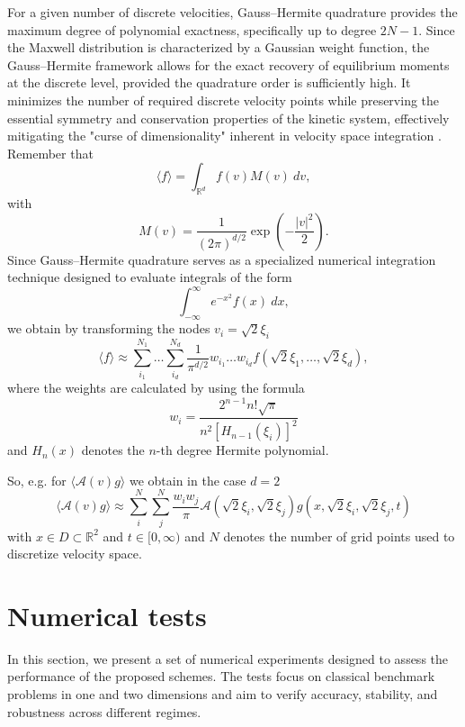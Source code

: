 \documentclass[final,11pt]{siamart251216}
\numberwithin{equation}{section}
\theoremstyle{definition}
\theoremstyle{remark}
\begin{document}
For a given number of discrete velocities, Gauss--Hermite quadrature provides the maximum degree of polynomial exactness, specifically up to degree $2N-1$.
 Since the Maxwell distribution is characterized by a Gaussian weight function, the Gauss--Hermite framework allows for the exact recovery of equilibrium moments at the discrete level, provided the quadrature order is sufficiently high.
  It minimizes the number of required discrete velocity points while preserving the essential symmetry and conservation properties of the kinetic system, effectively mitigating the "curse of dimensionality" inherent in velocity space integration \cite{PhysRevE.73.056702}.
  Remember that 
  \[
  \langle f \rangle = \int_{\mathbb{R}^d}f(v) M(v)\ dv,
  \]
  with
  \[
  M(v) = \frac{1}{(2\pi)^{d/2}} \exp \left( - \frac{|v|^2}{2}\right).
  \]
  Since Gauss--Hermite quadrature serves as a specialized numerical integration technique designed to evaluate integrals of the form 
\[
\int_{-\infty}^\infty e^{-x^2} f(x)\ dx,
\]
we obtain by transforming the nodes $v_i = \sqrt{2}\xi_i$
\[
\langle f \rangle \approx \sum_{i_{1}}^{N_1} \dots \sum_{i_{d}}^{N_d} \frac{1}{\pi^{d/2}} w_{i_1} \dots w_{i_d} f(\sqrt{2} \xi_1 , \dots , \sqrt{2} \xi_d ), 
\]
where the weights are calculated by using the formula 
\[
w_i = \frac{2^{n-1} n! \sqrt{\pi}}{n^2 [H_{n-1}(\xi_i) ]^2}
\]
and $H_n(x)$ denotes the $n$-th degree Hermite polynomial.

So, e.g. for $\langle \mathcal{A}(v) g \rangle$ we obtain in the case $d=2$
\[
\langle \mathcal{A}(v) g \rangle \approx \sum_{i}^{N}\sum_{j}^{N} \frac{w_i w_j}{\pi} \mathcal{A}(\sqrt{2} \xi_i,\sqrt{2} \xi_j) g(x,\sqrt{2} \xi_i,\sqrt{2} \xi_j,t)
\]
with $x \in D \subset \mathbb{R}^2$ and $t \in [0,\infty)$ and $N$ denotes the number of grid points used to discretize velocity space. 
\section{Numerical tests}\label{sec4}
In this section, we present a set of numerical experiments designed to assess the performance of the proposed schemes. The tests focus on classical benchmark problems in one and two dimensions and aim to verify accuracy, stability, and robustness across different regimes.
\end{document}
